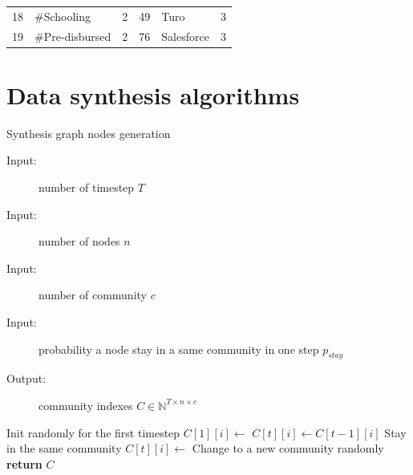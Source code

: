 \begin{longtable}{|r|l|l|r|l|l|}
	18                                & \#Schooling                        & 2                                                       & 49                               & Turo                                & 3                                                      \\
	19                                & \#Pre-disbursed                    & 2                                                       & 76                               & Salesforce                          & 3                                                      \\
\end{longtable}

\chapter{Data synthesis algorithms}

\begin{algorithm}
	\noindent
	\caption{Synthesis graph nodes generation}
	\label{alg:appendix-synthesis_graph_nodes}
	\begin{description}
		\item[Input:] number of timestep $T$
		\item[Input:] number of nodes $n$
		\item[Input:] number of community $c$
		\item[Input:] probability a node stay in a same community in one step $p_{stay}$
		\item[Output:] community indexes $C \in \mathbb{N}^{T \times n \times c}$
	\end{description}
	\begin{algorithmic}[1]
		\Comment Init randomly for the first timestep
		\State $C[1][i] \gets$ 
		\EndFor
		\State $C[t][i] \gets C[t-1][i]$
		\Comment Stay in the same community
		\Else
		\State $C[t][i] \gets$ 
		\Comment Change to a new community randomly
		\EndIf
		\EndFor
		\EndFor
		\State \textbf{return} $C$
		\EndFunction
	\end{algorithmic}
\end{algorithm}


